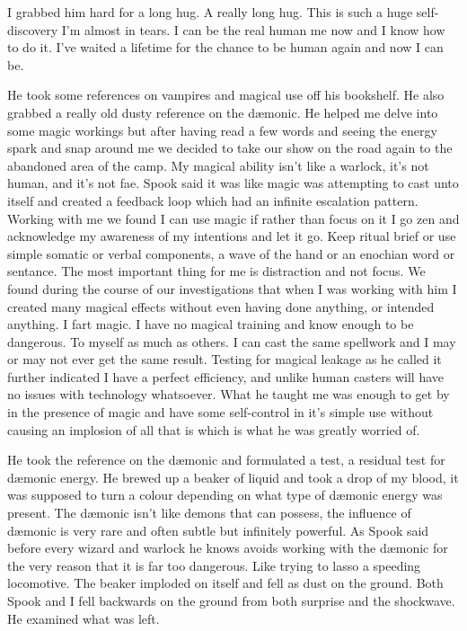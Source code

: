 I grabbed him hard for a long hug. A really long hug. This is such a huge self-discovery I'm almost in tears. I can be the real human me now and I know how to do it. I've waited a lifetime for the chance to be human again and now I can be.

He took some references on vampires and magical use off his bookshelf. He also grabbed a really old dusty reference on the d\ae monic. He helped me delve into some magic workings but after having read a few words and seeing the energy spark and snap around me we decided to take our show on the road again to the abandoned area of the camp. My magical ability isn't like a warlock, it's not human, and it's not fae. Spook said it was like magic was attempting to cast unto itself and created a feedback loop which had an infinite escalation pattern. Working with me we found I can use magic if rather than focus on it I go zen and acknowledge my awareness of my intentions and let it go. Keep ritual brief or use simple somatic or verbal components, a wave of the hand or an enochian word or sentance. The most important thing for me is distraction and not focus. We found during the course of our investigations that when I was working with him I created many magical effects without even having done anything, or intended anything. I fart magic. I have no magical training and know enough to be dangerous. To myself as much as others. I can cast the same spellwork and I may or may not ever get the same result. Testing for magical leakage as he called it further indicated I have a perfect efficiency, and unlike human casters will have no issues with technology whatsoever. What he taught me was enough to get by in the presence of magic and have some self-control in it's simple use without causing an implosion of all that is which is what he was greatly worried of.

He took the reference on the d\ae monic and formulated a test, a residual test for d\ae monic energy. He brewed up a beaker of liquid and took a drop of my blood, it was supposed to turn a colour depending on what type of d\ae monic energy was present. The d\ae monic isn't like demons that can possess, the influence of d\ae monic is very rare and often subtle but infinitely powerful. As Spook said before every wizard and warlock he knows avoids working with the d\ae monic for the very reason that it is far too dangerous. Like trying to lasso a speeding locomotive. The beaker imploded on itself and fell as dust on the ground. Both Spook and I fell backwards on the ground from both surprise and the shockwave. He examined what was left.


